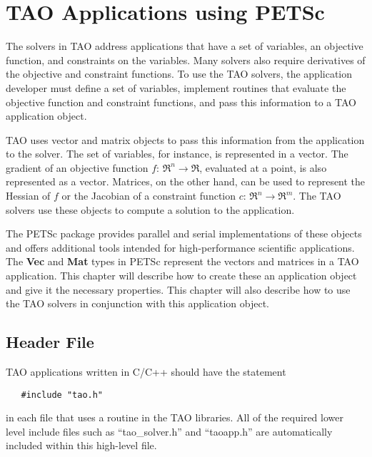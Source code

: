 \chapter{TAO Applications using PETSc}
\label{chapter:taoapplication}
\label{chapter:petscapp}

The solvers in TAO address applications that have a set of variables, an objective
function, and constraints on the variables.  Many solvers also require derivatives
of the objective and constraint functions.
To use the TAO solvers, the application developer must 
define a set of variables, implement routines that evaluate the 
objective function and constraint functions, and pass this information
to a TAO application object.   

TAO uses vector and matrix objects to pass this information from the
application to the solver.   The set of variables, for instance, is
represented in a vector.
The gradient of an objective function $f: \, \Re^n \to \Re$,
evaluated at a point, is also represented as a vector.
Matrices,  on the other hand,
can be used to represent the Hessian of $f$ or the Jacobian of a constraint
function $c: \, \Re^n \to \Re^m$.  The TAO solvers use
these objects to compute a solution to the application.

The PETSc package provides parallel and serial implementations of these
objects and offers additional tools intended for high-performance 
scientific applications.
The {\bf Vec} and {\bf Mat} types in PETSc
represent the vectors and matrices in a TAO application.
This chapter will describe how to create these an application object
and give it the necessary properties.  This chapter will also describe how to use
the TAO solvers in conjunction with this application object.

\section{Header File}

TAO applications written in C/C++ should have the statement 
\begin{verbatim}
   #include "tao.h"
\end{verbatim}
\noindent
in each file that uses a routine in the TAO libraries.
All of the required lower level include files such as ``tao\_solver.h''
and ``taoapp.h''
are automatically included within this high-level file.

